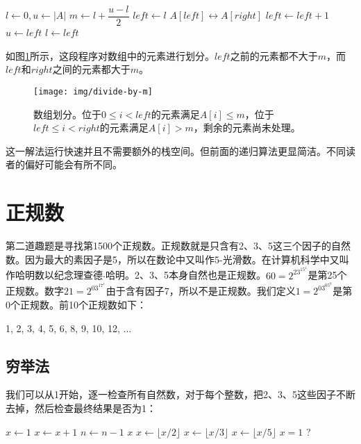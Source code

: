 \documentclass[b5paper]{ctexart}
\begin{document}
\begin{algorithmic}[1]
  \State $l \gets 0, u \gets |A|$
    \State $m \gets l + \dfrac{u - l}{2}$
    \State $left \gets l$
        \State $A[left] \leftrightarrow A[right]$
        \State $left \gets left + 1$
      \EndIf
    \EndFor
      \State $u \gets left$
    \Else
      \State $l \gets left$
    \EndIf
  \EndWhile
\EndFunction
\end{algorithmic}

如图\ref{fig:divide}所示，这段程序对数组中的元素进行划分。$left$之前的元素都不大于$m$，而$left$和$right$之间的元素都大于$m$。

\begin{figure}[htbp]
  \centering
  \texttt{[image: img/divide-by-m]}
  \caption{数组划分。位于$0 \leq i < left$的元素满足$A[i] \leq m$，位于$left \leq i < right$的元素满足$A[i] > m$，剩余的元素尚未处理。}
  \label{fig:divide}
\end{figure}

这一解法运行快速并且不需要额外的栈空间。但前面的递归算法更显简洁。不同读者的偏好可能会有所不同。

\section*{正规数}

第二道趣题是寻找第1500个正规数。正规数就是只含有2、3、5这三个因子的自然数。因为最大的素因子是5，所以在数论中又叫作5-光滑数。在计算机科学中又叫作哈明数以纪念理查德$\cdot$哈明。2、3、5本身自然也是正规数。$60 = 2^23^15^1$是第25个正规数。数字$21 = 2^03^17^1$由于含有因子7，所以不是正规数。我们定义$1=2^03^05^0$是第0个正规数。前10个正规数如下：

1, 2, 3, 4, 5, 6, 8, 9, 10, 12, ...

\subsection*{穷举法}
我们可以从1开始，逐一检查所有自然数，对于每个整数，把2、3、5这些因子不断去掉，然后检查最终结果是否为1：

\begin{algorithmic}[1]
  \State $x \gets 1$
    \State $x \gets x + 1$
      \State $n \gets n - 1$
    \EndIf
  \EndWhile
  \State \Return $x$
\EndFunction
\Statex
{}
    \State $x \gets \lfloor x / 2 \rfloor$
  \EndWhile
    \State $x \gets \lfloor x / 3 \rfloor$
  \EndWhile
    \State $x \gets \lfloor x / 5 \rfloor$
  \EndWhile
  \State \Return $x = 1$ ?
\EndFunction
\end{algorithmic}
\end{document}
